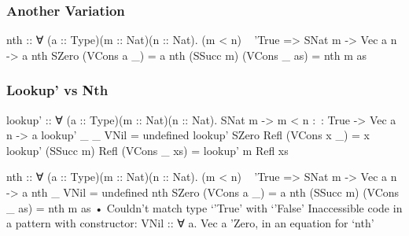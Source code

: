 \documentclass{beamer}
\begin{document}
\begin{frame}[fragile]\frametitle{Another Variation}
\begin{semiverbatim}
nth :: ∀ (a :: Type)(m :: Nat)(n :: Nat).
       (m < n) ~ 'True => SNat m -> Vec a n -> a
nth SZero     (VCons a _)  = a
nth (SSucc m) (VCons _ as) = nth m as
\end{semiverbatim}
\end{frame}

\begin{frame}[fragile]\frametitle{Lookup' vs Nth}
\begin{semiverbatim}
lookup' :: ∀ (a :: Type)(m :: Nat)(n :: Nat).
           SNat m -> m < n :~: True -> Vec a n -> a
lookup' _         _     VNil        = undefined
lookup' SZero     Refl (VCons x _)  = x
lookup' (SSucc m) Refl (VCons _ xs) = lookup' m Refl xs

nth :: ∀ (a :: Type)(m :: Nat)(n :: Nat).
       (m < n) ~ 'True => SNat m -> Vec a n -> a
nth _         VNil         =  undefined
nth SZero     (VCons a _)  = a
nth (SSucc m) (VCons _ as) = nth m as
  • Couldn't match type ‘'True’ with ‘'False’
    Inaccessible code in
      a pattern with constructor: VNil :: ∀ a. Vec a 'Zero,
      in an equation for ‘nth’
\end{semiverbatim}
\end{frame}

\begin{frame}[fragile]\frametitle{}
\begin{semiverbatim}
\end{semiverbatim}
\end{frame}
\end{document}
